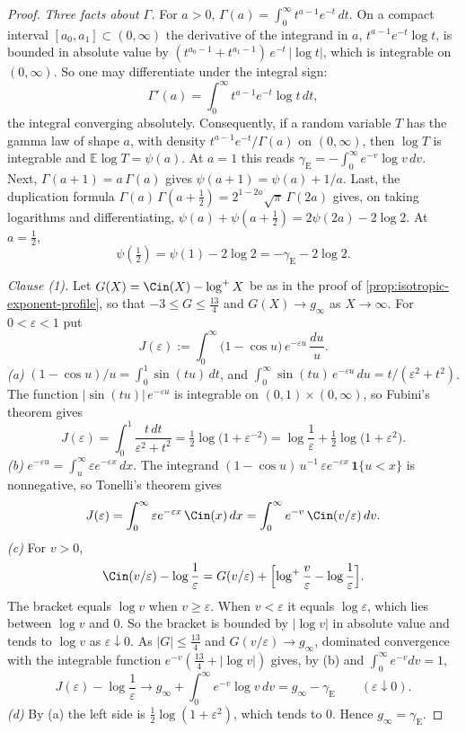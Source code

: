 \begin{proof}
\emph{Three facts about $\Gamma$.} For $a > 0$, $\Gamma(a) = \int_0^\infty t^{a-1}e^{-t}\,dt$. On
a compact interval $[a_0,a_1] \subset (0,\infty)$ the derivative of the integrand in $a$,
$t^{a-1}e^{-t}\log t$, is bounded in absolute value by
$(t^{a_0-1} + t^{a_1-1})\,e^{-t}\,|\log t|$, which is integrable on $(0,\infty)$. So one may
differentiate under the integral sign:
\[
  \Gamma'(a) = \int_0^\infty t^{a-1}e^{-t}\log t\,dt ,
\]
the integral converging absolutely. Consequently, if a random variable $T$ has the gamma law of
shape $a$, with density $t^{a-1}e^{-t}/\Gamma(a)$ on $(0,\infty)$, then $\log T$ is integrable and
$\mathbb{E}\log T = \psi(a)$. At $a = 1$ this reads
$\gamma_{\mathrm E} = -\int_0^\infty e^{-v}\log v\,dv$. Next, $\Gamma(a+1) = a\,\Gamma(a)$ gives
$\psi(a+1) = \psi(a) + 1/a$. Last, the duplication formula
$\Gamma(a)\,\Gamma(a+\tfrac12) = 2^{1-2a}\sqrt\pi\,\Gamma(2a)$ gives, on taking logarithms and
differentiating, $\psi(a) + \psi(a+\tfrac12) = 2\psi(2a) - 2\log 2$. At $a = \tfrac12$,
\[
  \psi(\tfrac12) = \psi(1) - 2\log 2 = -\gamma_{\mathrm E} - 2\log 2 .
\]

\emph{Clause (1).} Let $G(X) = \Cin(X) - \log^+ X$ be as in the proof of
\ref{prop:isotropic-exponent-profile}, so that $-3 \le G \le \tfrac{13}{4}$ and
$G(X) \to g_\infty$ as $X \to \infty$. For $0 < \varepsilon < 1$ put
\[
  J(\varepsilon) := \int_0^\infty \bigl(1 - \cos u\bigr)\,e^{-\varepsilon u}\,\frac{du}{u} .
\]
\emph{(a)} $(1 - \cos u)/u = \int_0^1 \sin(tu)\,dt$, and
$\int_0^\infty \sin(tu)\,e^{-\varepsilon u}\,du = t/(\varepsilon^2 + t^2)$. The function
$|\sin(tu)|\,e^{-\varepsilon u}$ is integrable on $(0,1) \times (0,\infty)$, so Fubini's theorem
gives
\[
  J(\varepsilon) = \int_0^1 \frac{t\,dt}{\varepsilon^2 + t^2}
   = \tfrac12\log\bigl(1 + \varepsilon^{-2}\bigr)
   = \log\frac1\varepsilon + \tfrac12\log\bigl(1 + \varepsilon^{2}\bigr) .
\]
\emph{(b)} $e^{-\varepsilon u} = \int_u^\infty \varepsilon e^{-\varepsilon x}\,dx$. The integrand
$(1 - \cos u)\,u^{-1}\,\varepsilon e^{-\varepsilon x}\,\mathbf 1\{u < x\}$ is nonnegative, so
Tonelli's theorem gives
\[
  J(\varepsilon) = \int_0^\infty \varepsilon e^{-\varepsilon x}\,\Cin(x)\,dx
   = \int_0^\infty e^{-v}\,\Cin(v/\varepsilon)\,dv .
\]
\emph{(c)} For $v > 0$,
\[
  \Cin(v/\varepsilon) - \log\frac1\varepsilon
   = G(v/\varepsilon) + \Bigl[\log^+\frac v\varepsilon - \log\frac1\varepsilon\Bigr] .
\]
The bracket equals $\log v$ when $v \ge \varepsilon$. When $v < \varepsilon$ it equals
$\log\varepsilon$, which lies between $\log v$ and $0$. So the bracket is bounded by $|\log v|$ in
absolute value and tends to $\log v$ as $\varepsilon \downarrow 0$. As $|G| \le \tfrac{13}{4}$ and
$G(v/\varepsilon) \to g_\infty$, dominated convergence with the integrable function
$e^{-v}(\tfrac{13}{4} + |\log v|)$ gives, by (b) and $\int_0^\infty e^{-v}dv = 1$,
\[
  J(\varepsilon) - \log\frac1\varepsilon \to g_\infty + \int_0^\infty e^{-v}\log v\,dv
   = g_\infty - \gamma_{\mathrm E} \qquad (\varepsilon \downarrow 0) .
\]
\emph{(d)} By (a) the left side is $\tfrac12\log(1 + \varepsilon^2)$, which tends to $0$. Hence
$g_\infty = \gamma_{\mathrm E}$.


\end{proof}
